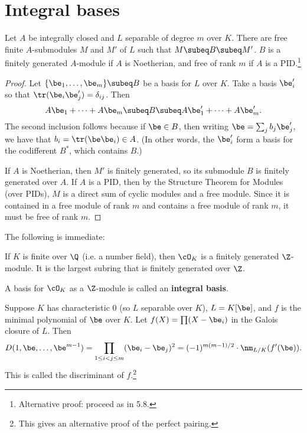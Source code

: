 \section{Integral bases}
\begin{pr}
Let $A$ be integrally closed and $L$ separable of degree $m$ over $K$. There are free finite $A$-submodules $M$ and $M'$ of $L$ such that $M\subeq B\subeq M'$.
$B$ is a finitely generated $A$-module if $A$ is Noetherian, and free of rank $m$ if $A$ is a PID.\footnote{Alternative proof: proceed as in 5.8.}
\end{pr}
\begin{proof}
Let $\{\be_1,\ldots, \be_m\}\subeq B$ be a basis for $L$ over $K$. Take a basis $\be_i'$ so that $\tr(\be_i\be_j')=\delta_{ij}$. Then
\[A\be_1+\cdots +A\be_m\subeq B\subeq A\be_1'+\cdots +A\be_m'.\]
The second inclusion follows because if $\be\in B$, then writing $\be=\sum_j b_j\be_j'$, we have that $b_i=\tr(\be\be_i)\in A$. (In other words, the $\be_i'$ form a basis for the codifferent $B^*$, which contains $B$.)

If $A$ is Noetherian, then $M'$ is finitely generated, so its submodule $B$ is finitely generated over $A$. If $A$ is a PID, then by the Structure Theorem for Modules (over PIDs), $M$ is a direct sum of cyclic modules and a free module. Since it is contained in a free module of rank $m$ and contains a free module of rank $m$, it must be free of rank $m$.
\end{proof}
The following is immediate:
\begin{thm}
If $K$ is finite over $\Q$ (i.e. a number field), then $\cO_K$ is a finitely generated $\Z$-module. It is the largest subring that is finitely generated over $\Z$.
\end{thm}
\begin{df}
A basis for $\cO_K$ as a $\Z$-module is called an \textbf{integral basis}.
\end{df}
\begin{pr}
Suppose $K$ has characteristic 0 (so $L$ separable over $K$), $L=K[\be]$, and $f$ is the minimal polynomial of $\be$ over $K$. Let $f(X)=\prod (X-\be_i)$ in the Galois closure of $L$. Then 
\[D(1,\be,\ldots, \be^{m-1})=\prod_{1\leq i<j\leq m}(\be_i-\be_j)^2=(-1)^{m(m-1)/2}\cdot \nm_{L/K}(f'(\be)).\]
This is called the discriminant of $f$.\footnote{This gives an alternative proof of the perfect pairing. }
\end{pr}
